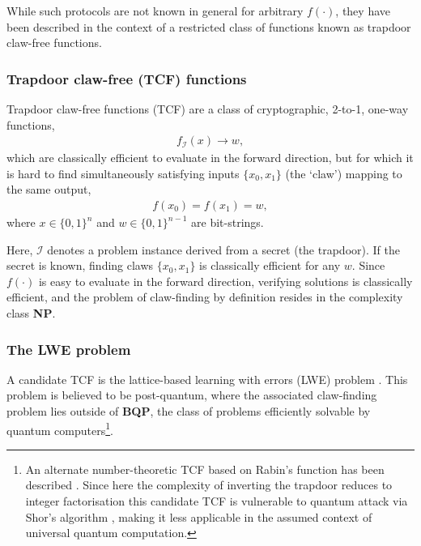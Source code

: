 While such protocols are not known in general for arbitrary $f(\cdot)$, they have been described in the context of a restricted class of functions known as trapdoor claw-free functions.

\subsubsection{Trapdoor claw-free (TCF) functions}

Trapdoor claw-free functions (TCF) are a class of cryptographic, 2-to-1, one-way functions,
\begin{align}
	f_\mathcal{I}(x)\to w,
\end{align}
which are classically efficient to evaluate in the forward direction, but for which it is hard to find simultaneously satisfying inputs $\{x_0,x_1\}$ (the `claw') mapping to the same output,
\begin{align}
	f(x_0)=f(x_1)=w,
\end{align}
where $x\in \{0,1\}^n$ and $w\in\{0,1\}^{n-1}$ are bit-strings.

Here, $\mathcal{I}$ denotes a problem instance derived from a secret (the trapdoor). If the secret is known, finding claws $\{x_0,x_1\}$ is classically efficient for any $w$. Since $f(\cdot)$ is easy to evaluate in the forward direction, verifying solutions is classically efficient, and the problem of  claw-finding by definition resides in the complexity class \textbf{NP}. %


\subsubsection{The LWE problem}

A candidate TCF is the lattice-based learning with errors (LWE) problem \cite{Goldwasser85, Regev09, Regev10}. This problem is believed to be post-quantum, where the associated claw-finding problem lies outside of \textbf{BQP}, the class of problems efficiently solvable by quantum computers\footnote{An alternate number-theoretic TCF based on Rabin's function has been described \cite{Rabin79, Goldwasser88}. Since here the complexity of inverting the trapdoor reduces to integer factorisation this candidate TCF is vulnerable to quantum attack via Shor's algorithm \cite{Shor97}, making it less applicable in the assumed context of universal quantum computation.}.

